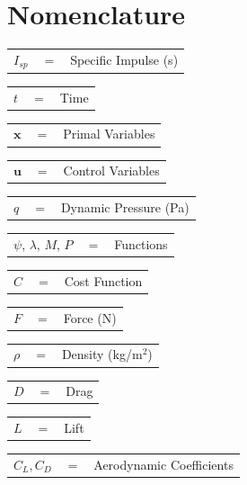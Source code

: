\documentclass[]{aiaa-tc}
\begin{document}
\section*{Nomenclature}
\noindent
\begin{tabular}{p{1.2cm}p{1cm}p{5cm}}
	 $I_{sp}$ & $=$ & Specific Impulse (s)\\ 
	\end{tabular} 
	  	\begin{tabular}{p{1.2cm}p{1cm}p{5cm}}
	  $t$ & $=$ & Time\\
	  	\end{tabular} 
	  	\begin{tabular}{p{1.2cm}p{1cm}p{5cm}}
	  $\textbf{x}$& $=$ & Primal Variables\\
	  	\end{tabular} 
	  	\begin{tabular}{p{1.2cm}p{1cm}p{5cm}}
	  $\textbf{u}$& $=$ & Control Variables\\
	  	\end{tabular} 
	  	\begin{tabular}{p{1.2cm}p{1cm}p{5cm}}
	  $q$ & $=$ & Dynamic Pressure (Pa)\\
	  	\end{tabular} 
	  	\begin{tabular}{p{1.2cm}p{1cm}p{5cm}}
	  $\psi$, $\lambda$, $M$, $P$ & $=$ & Functions\\
	  	\end{tabular} 
	  	\begin{tabular}{p{1.2cm}p{1cm}p{5cm}}
	  $C$ & $=$ & Cost Function\\
	  	\end{tabular} 
	  	\begin{tabular}{p{1.2cm}p{1cm}p{5cm}}
	  $F$ & $=$ & Force (N)\\
	  	\end{tabular} 
	  	\begin{tabular}{p{1.2cm}p{1cm}p{5cm}}
	  $\rho$ & $=$ & Density (kg/m$^2$)\\
	  	\end{tabular} 
	  			\begin{tabular}{p{1.2cm}p{1cm}p{5cm}}
	  				$D$ & $=$ & Drag\\
	  			\end{tabular} 
	  			\begin{tabular}{p{1.2cm}p{1cm}p{5cm}}
	  				$L$ & $=$ & Lift\\
	  			\end{tabular} 
	  	\begin{tabular}{p{1.2cm}p{1cm}p{5cm}}
	  $C_L,C_D$ & $=$ & Aerodynamic Coefficients\\
	  	\end{tabular} 
\end{document}
